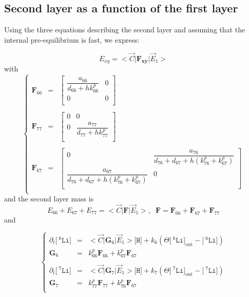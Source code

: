 \documentclass[aps,onecolumn,11pt]{revtex4}
\newcommand{\mychem}[1]{\mathtt{#1}}
\newcommand{\myconc}[1]{\big[#1\big]}
\newcommand{\spLi}[1]{{\!~^{#1}\mychem{Li}}}
\newcommand{\Li}[1]{\myconc{\spLi{#1}}}
\newcommand{\spproton}{\mychem{H}}
\newcommand{\proton}{\myconc{\spproton}}
\newcommand{\myout}[1]{{#1}_{\mathrm{out}}}
\newcommand{\LiOut}[1]{\myout{\Li{#1}}}
\newcommand{\mymat}[1]{{\bm{#1}}}
\begin{document}
\subsection{Second layer as a function of the first layer}

Using the three equations describing the second layer and assuming that the internal pre-equilibrium is fast, we express:

\begin{equation}
\boxed{
E_{xy} = <{\vec{C}} \vert \mymat{F_{xy}} \vert \vec{E}_1 > 
}
\end{equation}
with
\begin{equation}
\left\lbrace
\begin{array}{rcl}
\mymat{F}_{66} & = & 
\begin{bmatrix}
	\dfrac{a_{66}}{d_{66}+h k^p_{66}} & 0 \\
	0 & 0\\
\end{bmatrix} \\
\\
\mymat{F}_{77} & = & 
\begin{bmatrix}
	0 & 0 \\
	0 & \dfrac{a_{77}}{d_{77}+hk^p_{77}}\\
\end{bmatrix}  \\
\\
\mymat{F}_{67} & = & 
\begin{bmatrix}
	0 &\dfrac{a_{76}}{d_{76}+d_{67}+h(k^p_{76}+k^p_{67})}\\
	\dfrac{a_{67}}{d_{76}+d_{67}+h(k^p_{76}+k^p_{67})} & 0\\
\end{bmatrix} \\
\end{array}
\right.
\end{equation}
and the second layer mass is
\begin{equation}
E_{66} + E_{67} + E_{77} = <{\vec{C}} \vert \mymat{F} \vert \vec{E}_1 >, \;\;
 \mymat{F} 
 =  \mymat{F}_{66} + \mymat{F}_{67}  + \mymat{F}_{77}
\end{equation}
and


\begin{equation}
\left\lbrace
\begin{array}{rcl}
	\partial_t \Li{6} & = & <\vec{C}|\mymat{G}_6|\vec{E}_1> \proton+ k_6\left(\Theta \LiOut{6} - \Li{6}\right)\\
	\mymat{G}_6 &= & k^p_{66} \mymat{F}_{66} + k^p_{67}\mymat{F}_{67}	\\
	\\
	\partial_t \Li{7} & = & <\vec{C}|\mymat{G}_7|\vec{E}_1> \proton + k_7\left(\Theta \LiOut{7} - \Li{7}\right)\\
	\mymat{G}_7 & = & k^p_{77} \mymat{F}_{77} + k^p_{76}\mymat{F}_{67} \\
\end{array}
\right.
\end{equation}
\end{document}
